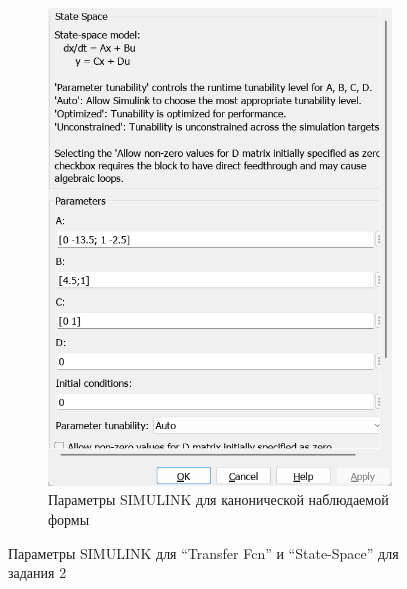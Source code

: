 \documentclass[a4paper, 12pt]{article}
\begin{document}
\begin{figure}[H]
\begin{subfigure}{0.3\textwidth}
            \includegraphics[width=\linewidth]{canonical_observable_form_2_window.png}
            \caption{Параметры SIMULINK для канонической наблюдаемой формы}
            \label{fig:cof2w}
        \end{subfigure}
        \caption{Параметры SIMULINK для ``Transfer Fcn'' и ``State-Space'' для задания 2}
        \label{fig:windows2}
    \end{figure}
\end{document}
